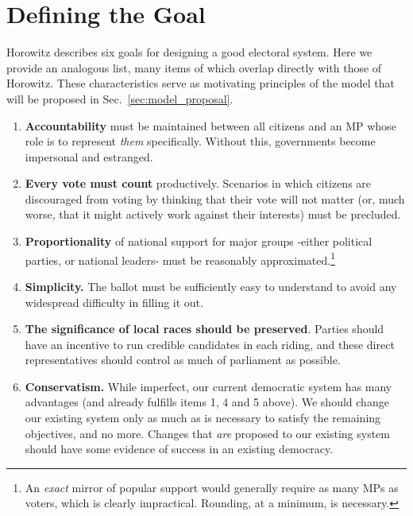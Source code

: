 \section{Defining the Goal}
\label{sec:goal_list}

Horowitz describes six goals for designing a good electoral system\citep{Horowitz}. Here we provide an analogous list, many items of which overlap directly with those of Horowitz. These characteristics serve as motivating principles of the model that will be proposed in Sec.~\ref{sec:model_proposal}.
\begin{enumerate}
\item \textbf{Accountability} must be maintained between all citizens and an MP whose role is to represent \emph{them} specifically. Without this, governments become impersonal and estranged.
\item \textbf{Every vote must count} productively. Scenarios in which citizens are discouraged from voting by thinking that their vote will not matter (or, much worse, that it might actively work against their interests) must be precluded.
\item \textbf{Proportionality} of national support for major groups \--either political parties, or national leaders\-- must be reasonably approximated.\footnote{
An \emph{exact} mirror of popular support would generally require as many MPs as voters, which is clearly impractical. Rounding, at a minimum, is necessary.
}
\item   \textbf{Simplicity.} The ballot must be sufficiently easy to understand to avoid any widespread difficulty in filling it out.

\item  \textbf{The significance of local races should be preserved}. Parties should have an incentive to run credible candidates in each riding, and these direct representatives should control as much of parliament as possible.
\item \textbf{Conservatism.} While imperfect, our current democratic system has many advantages (and already fulfills items 1, 4 and 5 above). We should change our existing system only as much as is necessary to satisfy the remaining objectives, and no more. Changes that \emph{are} proposed to our existing system should have some evidence of success in an existing democracy.
\end{enumerate}

